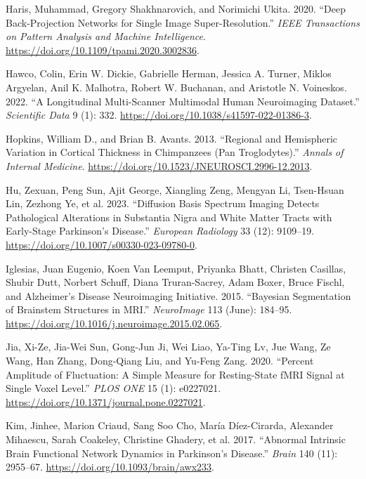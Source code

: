 \documentclass[
  table]{article}
\newlength{\cslhangindent}
\newenvironment{CSLReferences}[2] %
 {\begin{list}{}{%
  \setlength{\itemindent}{0pt}
  \setlength{\leftmargin}{0pt}
  \setlength{\parsep}{0pt}
  \ifodd #1
   \setlength{\leftmargin}{\cslhangindent}
   \setlength{\itemindent}{-1\cslhangindent}
  \fi
  \setlength{\itemsep}{#2\baselineskip}}}
 {\end{list}}
\begin{document}
\begin{CSLReferences}{1}{0}
Haris, Muhammad, Gregory Shakhnarovich, and Norimichi Ukita. 2020.
{``Deep {Back}-{Projection} {Networks} for {Single} {Image}
{Super}-Resolution.''} \emph{IEEE Transactions on Pattern Analysis and
Machine Intelligence}. \url{https://doi.org/10.1109/tpami.2020.3002836}.

Hawco, Colin, Erin W. Dickie, Gabrielle Herman, Jessica A. Turner,
Miklos Argyelan, Anil K. Malhotra, Robert W. Buchanan, and Aristotle N.
Voineskos. 2022. {``A Longitudinal Multi-Scanner Multimodal Human
Neuroimaging Dataset.''} \emph{Scientific Data} 9 (1): 332.
\url{https://doi.org/10.1038/s41597-022-01386-3}.

Hopkins, William D., and Brian B. Avants. 2013. {``Regional and
Hemispheric Variation in Cortical Thickness in Chimpanzees ({Pan}
Troglodytes).''} \emph{Annals of Internal Medicine}.
\url{https://doi.org/10.1523/JNEUROSCI.2996-12.2013}.

Hu, Zexuan, Peng Sun, Ajit George, Xiangling Zeng, Mengyan Li,
Tsen-Hsuan Lin, Zezhong Ye, et al. 2023. {``Diffusion Basis Spectrum
Imaging Detects Pathological Alterations in Substantia Nigra and White
Matter Tracts with Early-Stage {Parkinson}{'}s Disease.''}
\emph{European Radiology} 33 (12): 9109--19.
\url{https://doi.org/10.1007/s00330-023-09780-0}.

Iglesias, Juan Eugenio, Koen Van Leemput, Priyanka Bhatt, Christen
Casillas, Shubir Dutt, Norbert Schuff, Diana Truran-Sacrey, Adam Boxer,
Bruce Fischl, and Alzheimer's Disease Neuroimaging Initiative. 2015.
{``Bayesian Segmentation of Brainstem Structures in {MRI}.''}
\emph{NeuroImage} 113 (June): 184--95.
\url{https://doi.org/10.1016/j.neuroimage.2015.02.065}.

Jia, Xi-Ze, Jia-Wei Sun, Gong-Jun Ji, Wei Liao, Ya-Ting Lv, Jue Wang, Ze
Wang, Han Zhang, Dong-Qiang Liu, and Yu-Feng Zang. 2020. {``Percent
Amplitude of Fluctuation: {A} Simple Measure for Resting-State {fMRI}
Signal at Single Voxel Level.''} \emph{PLOS ONE} 15 (1): e0227021.
\url{https://doi.org/10.1371/journal.pone.0227021}.

Kim, Jinhee, Marion Criaud, Sang Soo Cho, María Díez-Cirarda, Alexander
Mihaescu, Sarah Coakeley, Christine Ghadery, et al. 2017. {``Abnormal
Intrinsic Brain Functional Network Dynamics in {Parkinson}{'}s
Disease.''} \emph{Brain} 140 (11): 2955--67.
\url{https://doi.org/10.1093/brain/awx233}.


\end{CSLReferences}
\end{document}
